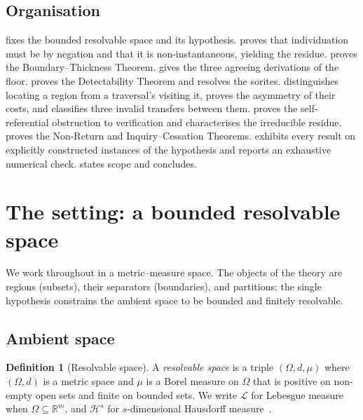 \documentclass[11pt,twocolumn,a4paper]{article}
\theoremstyle{thmstyle}
\theoremstyle{definition}
\newtheorem{definition}[theorem]{Definition}
\theoremstyle{remark}
\newcommand{\R}{\mathbb{R}}
\newcommand{\Space}{\Omega}
\newcommand{\Leb}{\mathcal{L}}
\newcommand{\Haus}{\mathcal{H}}
\begin{document}
\subsection{Organisation}

 fixes the bounded resolvable space and its hypothesis.
 proves that individuation must be by negation and that it
is non-instantaneous, yielding the residue.  proves the
Boundary--Thickness Theorem.  gives the three agreeing
derivations of the floor.  proves the Detectability Theorem
and resolves the sorites.  distinguishes locating a region
from a traversal's visiting it, proves the asymmetry of their costs, and
classifies three invalid transfers between them.  proves the
self-referential obstruction to verification and characterises the irreducible
residue.  proves the Non-Return and Inquiry--Cessation
Theorems.  exhibits every result on explicitly constructed
instances of the hypothesis and reports an exhaustive numerical check.
 states scope and concludes.


\section{The setting: a bounded resolvable space}
\label{sec:setting}

We work throughout in a metric--measure space. The objects of the theory are
regions (subsets), their separators (boundaries), and partitions; the single
hypothesis constrains the ambient space to be bounded and finitely resolvable.

\subsection{Ambient space}

\begin{definition}[Resolvable space]
\label{def:space}
A \emph{resolvable space} is a triple $(\Space,d,\mu)$ where $(\Space,d)$ is a
metric space and $\mu$ is a Borel measure on $\Space$ that is positive on
non-empty open sets and finite on bounded sets. We write $\Leb$ for Lebesgue
measure when $\Space\subseteq\R^{m}$, and $\Haus^{s}$ for $s$-dimensional
Hausdorff measure~\citep{federer1969,mattila1995}.
\end{definition}
\end{document}
